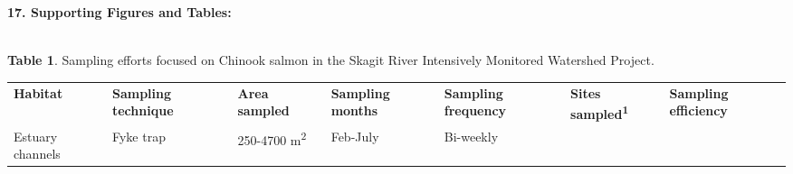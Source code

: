 \documentclass[]{article}
\begin{document}
\textbf{}

\textbf{17. Supporting Figures and Tables:{~}}

\textbf{}\\

\textbf{Table 1}. Sampling efforts focused on Chinook salmon in the
Skagit River Intensively Monitored Watershed Project.

\begin{longtable}[]{@{}lllllll@{}}
\toprule
\begin{minipage}[t]{0.12\columnwidth}\raggedright\strut
\textbf{Habitat}\strut
\end{minipage} & \begin{minipage}[t]{0.12\columnwidth}\raggedright\strut
\textbf{Sampling technique}\strut
\end{minipage} & \begin{minipage}[t]{0.12\columnwidth}\raggedright\strut
\textbf{Area sampled}\strut
\end{minipage} & \begin{minipage}[t]{0.12\columnwidth}\raggedright\strut
\textbf{Sampling months}\strut
\end{minipage} & \begin{minipage}[t]{0.12\columnwidth}\raggedright\strut
\textbf{Sampling frequency}\strut
\end{minipage} & \begin{minipage}[t]{0.12\columnwidth}\raggedright\strut
\textbf{Sites sampled\textsuperscript{1}}\strut
\end{minipage} & \begin{minipage}[t]{0.12\columnwidth}\raggedright\strut
\textbf{Sampling efficiency}\strut
\end{minipage}\tabularnewline
\begin{minipage}[t]{0.12\columnwidth}\raggedright\strut
Estuary channels\strut
\end{minipage} & \begin{minipage}[t]{0.12\columnwidth}\raggedright\strut
Fyke trap\strut
\end{minipage} & \begin{minipage}[t]{0.12\columnwidth}\raggedright\strut
250-4700 m\textsuperscript{2}\strut
\end{minipage} & \begin{minipage}[t]{0.12\columnwidth}\raggedright\strut
Feb-July\strut
\end{minipage} & \begin{minipage}[t]{0.12\columnwidth}\raggedright\strut
Bi-weekly\strut

\end{minipage}
\end{longtable}
\end{document}
